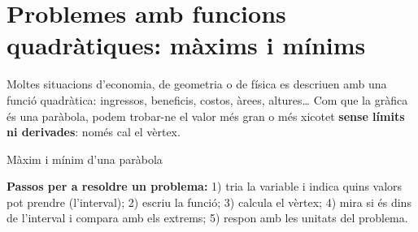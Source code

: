 \documentclass[11pt,a4paper]{article}
\makeatletter
\newcommand{\lt}{<}\newcommand{\gt}{>}
\newcommand{\fmm}[1]{\setbox0=\hbox{$#1$}\ifdim\wd0>0.8\linewidth\def\fmmnext{\fmmdisp{#1}}\else\def\fmmnext{\mbox{\box0}}\fi\fmmnext}
\def\fmmdisp#1{\@ifnextchar.{\fmmdispp{#1}}{\@ifnextchar,{\fmmdispc{#1}}{\@ifnextchar;{\fmmdisps{#1}}{\fmdisp{#1}}}}}
\def\fmmdispp#1.{\fmdisp{#1\,.}}\def\fmmdispc#1,{\fmdisp{#1\,,}}\def\fmmdisps#1;{\fmdisp{#1\,;}}
\newcommand{\fmdisp}[1]{\[\setbox2=\hbox{$\displaystyle #1$}\ifdim\wd2>\linewidth\resizebox{\linewidth}{!}{\box2}\else\box2\fi\]}
\makeatother
\begin{document}
\section{Problemes amb funcions quadràtiques: màxims i mínims}\hypertarget{sec9}{}

Moltes situacions d'economia, de geometria o de física es descriuen amb una funció quadràtica: ingressos, beneficis, costos, àrees, altures\dots{} Com que la gràfica és una paràbola, podem trobar-ne el valor més gran o més xicotet \textbf{sense límits ni derivades}: només cal el vèrtex.

\begin{fmdef}{Màxim i mínim d'una paràbola}

\textbf{Passos per a resoldre un problema:} 1) tria la variable i indica quins valors pot prendre (l'interval); 2) escriu la funció; 3) calcula el vèrtex; 4) mira si és dins de l'interval i compara amb els extrems; 5) respon amb les unitats del problema.
\end{fmdef}
\end{document}
